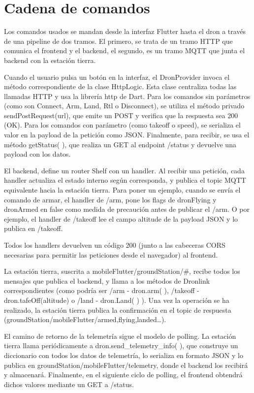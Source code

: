 \section{Cadena de comandos}
Los comandos usados se mandan desde la interfaz Flutter hasta el dron a través de una pipeline de dos tramos. El primero, se trata de un tramo HTTP que comunica el frontend y el backend, el segundo, es un tramo MQTT que junta el backend con la estación tierra.

Cuando el usuario pulsa un botón en la interfaz, el DronProvider invoca el método correspondiente de la clase HttpLogic. Esta clase centraliza todas las llamadas HTTP y usa la librería http de Dart. Para los comandos sin parámetros (como son Connect, Arm, Land, Rtl o Disconnect), se utiliza el método privado sendPostRequest(url), que emite un POST y verifica que la respuesta sea 200 (OK). Para los comandos con parámetro (como takeoff o speed), se serializa el valor en la payload de la petición como JSON. Finalmente, para recibir, se usa el método getStatus( ), que realiza un GET al endpoint /status y devuelve una payload con los datos.

El backend, define un router Shelf con un handler. Al recibir una petición, cada handler actualiza el estado interno según corresponda, y publica el topic MQTT equivalente hacia la estación tierra. Para poner un ejemplo, cuando se envía el comando de armar, el handler de /arm, pone los flags de dronFlying y dronArmed en false como medida de precaución antes de publicar el /arm. O por ejemplo, el handler de /takeoff lee el campo altitude de la payload JSON y lo publica en /takeoff. 

Todos los handlers devuelven un código 200 (junto a las cabeceras CORS necesarias para permitir las peticiones desde el navegador) al frontend.

La estación tierra, suscrita a mobileFlutter/groundStation/\#, recibe todos los mensajes que publica el backend, y llama a los métodos de Dronlink correspondientes (como podría ser /arm - dron.arm( ), /takeoff - dron.tafeOff(altitude) o /land - dron.Land( ) ). Una vez la operación se ha realizado, la estación tierra publica la confirmación en el topic de respuesta (groundStation/mobileFlutter/armed,flying,landed…).

El camino de retorno de la telemetría sigue el modelo de polling. La estación tierra llama periódicamente a dron.send\_telemetry\_info( ), que construye un diccionario con todos los datos de telemetría, lo serializa en formato JSON y lo publica en groundStation/mobileFlutter/telemetry, donde el backend los recibirá y almacenará. Finalmente, en el siguiente ciclo de polling, el frontend obtendrá dichos valores mediante un GET a /status.

